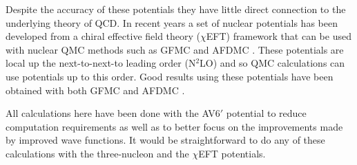 Despite the accuracy of these potentials they have little direct connection to the underlying theory of QCD. In recent years a set of nuclear potentials has been developed from a chiral effective field theory ($\chi$EFT) framework that can be used with nuclear QMC methods such as GFMC and AFDMC \cite{epelbaum2009,machleidt2011}. These potentials are local up the next-to-next-to leading order (N$^2$LO) and so QMC calculations can use potentials up to this order. Good results using these potentials have been obtained with both GFMC \cite{lynn2014} and AFDMC \cite{lonardoni2018}.

All calculations here have been done with the AV6$'$ potential to reduce computation requirements as well as to better focus on the improvements made by improved wave functions. It would be straightforward to do any of these calculations with the three-nucleon and the $\chi$EFT potentials.
